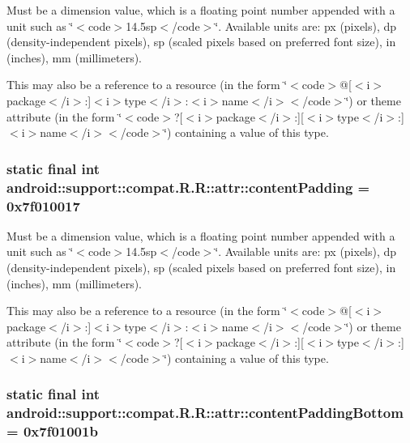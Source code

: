 Must be a dimension value, which is a floating point number appended with a unit such as \char`\"{}$<$code$>$14.5sp$<$/code$>$\char`\"{}. Available units are: px (pixels), dp (density-independent pixels), sp (scaled pixels based on preferred font size), in (inches), mm (millimeters). 

This may also be a reference to a resource (in the form \char`\"{}$<$code$>$@\mbox{[}$<$i$>$package$<$/i$>$:\mbox{]}$<$i$>$type$<$/i$>$:$<$i$>$name$<$/i$>$$<$/code$>$\char`\"{}) or theme attribute (in the form \char`\"{}$<$code$>$?\mbox{[}$<$i$>$package$<$/i$>$:\mbox{]}\mbox{[}$<$i$>$type$<$/i$>$:\mbox{]}$<$i$>$name$<$/i$>$$<$/code$>$\char`\"{}) containing a value of this type. \hypertarget{classandroid_1_1support_1_1compat_1_1_r_1_1attr_872a8cfad6fb8530b2778e054eaddea0}{
\subsubsection[{contentPadding}]{\setlength{\rightskip}{0pt plus 5cm}static final int android::support::compat.R.R::attr::contentPadding = 0x7f010017}}
\label{classandroid_1_1support_1_1compat_1_1_r_1_1attr_872a8cfad6fb8530b2778e054eaddea0}


Must be a dimension value, which is a floating point number appended with a unit such as \char`\"{}$<$code$>$14.5sp$<$/code$>$\char`\"{}. Available units are: px (pixels), dp (density-independent pixels), sp (scaled pixels based on preferred font size), in (inches), mm (millimeters). 

This may also be a reference to a resource (in the form \char`\"{}$<$code$>$@\mbox{[}$<$i$>$package$<$/i$>$:\mbox{]}$<$i$>$type$<$/i$>$:$<$i$>$name$<$/i$>$$<$/code$>$\char`\"{}) or theme attribute (in the form \char`\"{}$<$code$>$?\mbox{[}$<$i$>$package$<$/i$>$:\mbox{]}\mbox{[}$<$i$>$type$<$/i$>$:\mbox{]}$<$i$>$name$<$/i$>$$<$/code$>$\char`\"{}) containing a value of this type. \hypertarget{classandroid_1_1support_1_1compat_1_1_r_1_1attr_340a20f422ce622b8a360968c39ea71c}{
\subsubsection[{contentPaddingBottom}]{\setlength{\rightskip}{0pt plus 5cm}static final int android::support::compat.R.R::attr::contentPaddingBottom = 0x7f01001b}}
\label{classandroid_1_1support_1_1compat_1_1_r_1_1attr_340a20f422ce622b8a360968c39ea71c}


